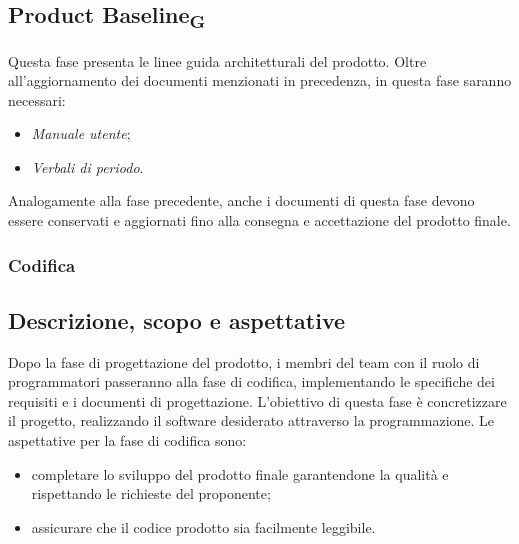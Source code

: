 \documentclass{article}
\begin{document}
\subsection*{Product Baseline\textsubscript{G}}
Questa fase presenta le linee guida architetturali del prodotto. Oltre all'aggiornamento dei documenti menzionati in precedenza, in questa fase saranno necessari:
\begin{itemize}
    \item \textit{Manuale utente};
    \item \textit{Verbali di periodo}.
\end{itemize}
Analogamente alla fase precedente, anche i documenti di questa fase devono essere conservati e aggiornati fino alla consegna e accettazione del prodotto finale.

\subsubsection{Codifica}
\subsection{Descrizione, scopo e aspettative}
Dopo la fase di progettazione del prodotto, i membri del team con il ruolo di programmatori passeranno alla fase di codifica, implementando le specifiche dei requisiti e i documenti di progettazione. L'obiettivo di questa fase è concretizzare il progetto, realizzando il software desiderato attraverso la programmazione. Le aspettative per la fase di codifica sono:
\begin{itemize}
    \item completare lo sviluppo del prodotto finale garantendone la qualità e rispettando le richieste del proponente;
    \item assicurare che il codice prodotto sia facilmente leggibile.
\end{itemize}
\end{document}
